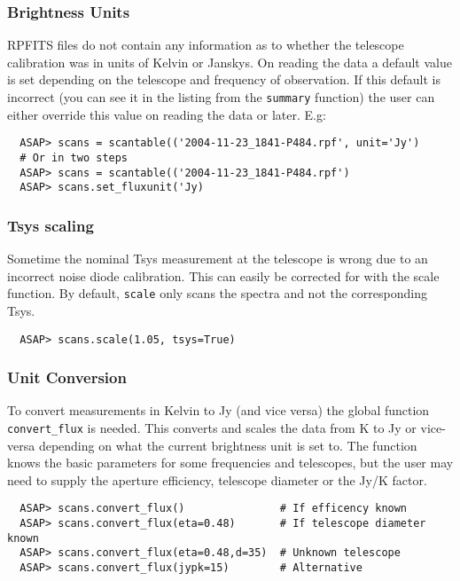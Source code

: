 \documentclass[11pt]{article}
\newcommand{\cmd}[1]{{\tt #1}}
\begin{document}
\subsubsection{Brightness Units}

RPFITS files do not contain any information as
to whether the telescope calibration was in units of Kelvin or
Janskys.  On reading the data a default value is set depending on the
telescope and frequency of observation.  If this default is incorrect
(you can see it in the listing from the \cmd{summary} function) the
user can either override this value on reading the data or later.
E.g:

\begin{verbatim}
  ASAP> scans = scantable(('2004-11-23_1841-P484.rpf', unit='Jy')
  # Or in two steps
  ASAP> scans = scantable(('2004-11-23_1841-P484.rpf')
  ASAP> scans.set_fluxunit('Jy)
\end{verbatim}

\subsubsection{Tsys scaling}

Sometime the nominal Tsys measurement at the
telescope is wrong due to an incorrect noise diode calibration. This
can easily be corrected for with the scale function. By default,
\cmd{scale} only scans the spectra and not the corresponding Tsys.

\begin{verbatim}
  ASAP> scans.scale(1.05, tsys=True)
\end{verbatim}

\subsubsection{Unit Conversion}

To convert measurements in Kelvin to Jy (and
vice versa) the global function \cmd{convert\_flux} is needed. This
converts and scales the data from K to Jy or vice-versa depending on
what the current brightness unit is set to. The function knows the
basic parameters for some frequencies and telescopes, but the user may
need to supply the aperture efficiency, telescope diameter or the Jy/K
factor.

\begin{verbatim}
  ASAP> scans.convert_flux()               # If efficency known
  ASAP> scans.convert_flux(eta=0.48)       # If telescope diameter known
  ASAP> scans.convert_flux(eta=0.48,d=35)  # Unknown telescope
  ASAP> scans.convert_flux(jypk=15)        # Alternative
\end{verbatim}
\end{document}
